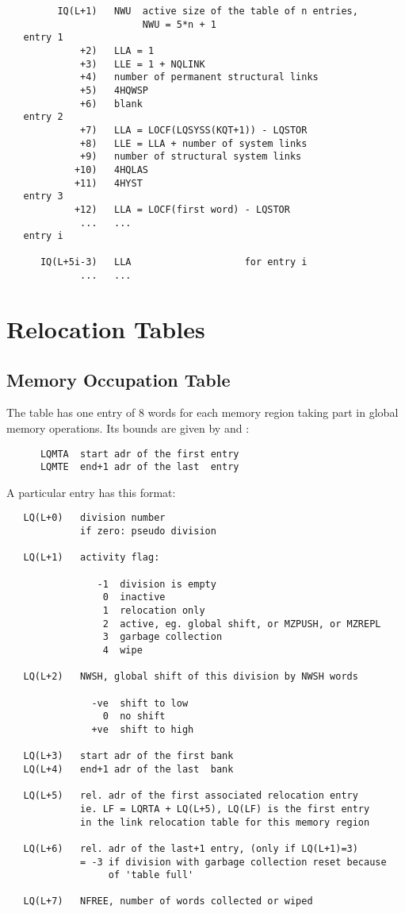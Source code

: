 \begin{verbatim}
         IQ(L+1)   NWU  active size of the table of n entries,
                        NWU = 5*n + 1
   entry 1
             +2)   LLA = 1
             +3)   LLE = 1 + NQLINK
             +4)   number of permanent structural links
             +5)   4HQWSP
             +6)   blank
   entry 2
             +7)   LLA = LOCF(LQSYSS(KQT+1)) - LQSTOR
             +8)   LLE = LLA + number of system links
             +9)   number of structural system links
            +10)   4HQLAS
            +11)   4HYST
   entry 3
            +12)   LLA = LOCF(first word) - LQSTOR
             ...   ...
   entry i

      IQ(L+5i-3)   LLA                    for entry i
             ...   ...
\end{verbatim} 

\section{Relocation Tables}

\subsection*{Memory Occupation Table}

The table has one entry of 8 words for each memory region
taking part in global memory operations.
Its bounds are given by  and :

\begin{verbatim}
      LQMTA  start adr of the first entry
      LQMTE  end+1 adr of the last  entry
\end{verbatim} 

A particular entry has this format:

\begin{verbatim}
   LQ(L+0)   division number
             if zero: pseudo division

   LQ(L+1)   activity flag:

                -1  division is empty
                 0  inactive
                 1  relocation only
                 2  active, eg. global shift, or MZPUSH, or MZREPL
                 3  garbage collection
                 4  wipe

   LQ(L+2)   NWSH, global shift of this division by NWSH words

               -ve  shift to low
                 0  no shift
               +ve  shift to high

   LQ(L+3)   start adr of the first bank
   LQ(L+4)   end+1 adr of the last  bank

   LQ(L+5)   rel. adr of the first associated relocation entry
             ie. LF = LQRTA + LQ(L+5), LQ(LF) is the first entry
             in the link relocation table for this memory region

   LQ(L+6)   rel. adr of the last+1 entry, (only if LQ(L+1)=3)
             = -3 if division with garbage collection reset because
                  of 'table full'

   LQ(L+7)   NFREE, number of words collected or wiped
\end{verbatim} 

